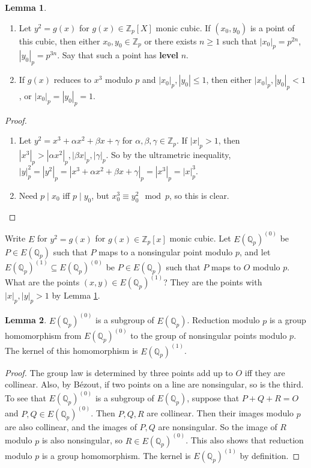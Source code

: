 \documentclass{article}
\newcommand{\Z}{\mathbb{Z}}
\newcommand{\Q}{\mathbb{Q}}
\newcommand{\rb}[1]{\left( #1 \right)}
\renewcommand{\sb}[1]{\left[ #1 \right]}
\newcommand{\abs}[1]{\left\lvert #1 \right\rvert}
\theoremstyle{definition}\newtheorem{definition}{Definition}[section]
\theoremstyle{definition}\newtheorem{remark}[definition]{Remark}
\theoremstyle{definition}\newtheorem*{example}{Example}
\theoremstyle{definition}\newtheorem*{note}{Note}
\newtheorem{lemma}[definition]{Lemma}
\begin{document}
\begin{lemma}
\label{lem:7.1}
\hfill
\begin{enumerate}
\item Let $ y^2 = g\rb{x} $ for $ g\rb{x} \in \Z_p\sb{X} $ monic cubic. If $ \rb{x_0, y_0} $ is a point of this cubic, then either $ x_0, y_0 \in \Z_p $ or there exists $ n \ge 1 $ such that $ \abs{x_0}_p = p^{2n} $, $ \abs{y_0}_p = p^{3n} $. Say that such a point has \textbf{level} $ n $.
\item If $ g\rb{x} $ reduces to $ x^3 $ modulo $ p $ and $ \abs{x_0}_p, \abs{y_0} \le 1 $, then either $ \abs{x_0}_p, \abs{y_0}_p < 1 $, or $ \abs{x_0}_p = \abs{y_0}_p = 1 $.
\end{enumerate}
\end{lemma}

\begin{proof}
\hfill
\begin{enumerate}
\item Let $ y^2 = x^3 + \alpha x^2 + \beta x + \gamma $ for $ \alpha, \beta, \gamma \in \Z_p $. If $ \abs{x}_p > 1 $, then $ \abs{x^3}_p > \abs{\alpha x^2}_p, \abs{\beta x}_p, \abs{\gamma}_p $. So by the ultrametric inequality, $ \abs{y}_p^2 = \abs{y^2}_p = \abs{x^3 + \alpha x^2 + \beta x + \gamma}_p = \abs{x^3}_p = \abs{x}_p^3 $.
\item Need $ p \mid x_0 $ iff $ p \mid y_0 $, but $ x_0^3 \equiv y_0^2 \mod p $, so this is clear.
\end{enumerate}
\end{proof}

Write $ E $ for $ y^2 = g\rb{x} $ for $ g\rb{x} \in \Z_p\sb{x} $ monic cubic. Let $ E\rb{\Q_p}^{\rb{0}} $ be $ P \in E\rb{\Q_p} $ such that $ P $ maps to a nonsingular point modulo $ p $, and let $ E\rb{\Q_p}^{\rb{1}} \subseteq E\rb{\Q_p}^{\rb{0}} $ be $ P \in E\rb{\Q_p} $ such that $ P $ maps to $ O $ modulo $ p $. What are the points $ \rb{x, y} \in E\rb{\Q_p}^{\rb{1}} $? They are the points with $ \abs{x}_p, \abs{y}_p > 1 $ by Lemma \ref{lem:7.1}.

\begin{lemma}
\label{lem:7.2}
$ E\rb{\Q_p}^{\rb{0}} $ is a subgroup of $ E\rb{\Q_p} $. Reduction modulo $ p $ is a group homomorphism from $ E\rb{\Q_p}^{\rb{0}} $ to the group of nonsingular points modulo $ p $. The kernel of this homomorphism is $ E\rb{\Q_p}^{\rb{1}} $.
\end{lemma}

\begin{proof}
The group law is determined by three points add up to $ O $ iff they are collinear. Also, by Bézout, if two points on a line are nonsingular, so is the third. To see that $ E\rb{\Q_p}^{\rb{0}} $ is a subgroup of $ E\rb{\Q_p} $, suppose that $ P + Q + R = O $ and $ P, Q \in E\rb{\Q_p}^{\rb{0}} $. Then $ P, Q, R $ are collinear. Then their images modulo $ p $ are also collinear, and the images of $ P, Q $ are nonsingular. So the image of $ R $ modulo $ p $ is also nonsingular, so $ R \in E\rb{\Q_p}^{\rb{0}} $. This also shows that reduction modulo $ p $ is a group homomorphism. The kernel is $ E\rb{\Q_p}^{\rb{1}} $ by definition.
\end{proof}
\end{document}
